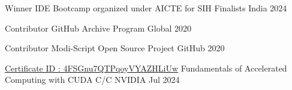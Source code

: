 \documentclass[11pt, a4paper]{awesome-cv}
\begin{document}


\begin{cvhonors}

  \cvhonor
    {Winner} %
    {IDE Bootcamp organized under AICTE for SIH Finalists} %
    {India} %
    {2024} %

\end{cvhonors}



\begin{cvhonors}

  \cvhonor
    {Contributor} %
    {GitHub Archive Program} %
    {Global} %
    {2020} %

  \cvhonor
    {Contributor} %
    {Modi-Script Open Source Project} %
    {GitHub} %
    {2020} %

\end{cvhonors}






\begin{cventries}

\cventry
  {\href{https://learn.nvidia.com/certificates?id=4FSGnu7QTPqoyVYAZHLiUw}{Certificate ID : 4FSGnu7QTPqoyVYAZHLiUw}}
  {Fundamentals of Accelerated Computing with CUDA C/C}
  {NVIDIA}
  {Jul 2024}
  {
    \textbf{}
  }

\vspace{-0.7cm}
\end{cventries}
\end{document}
